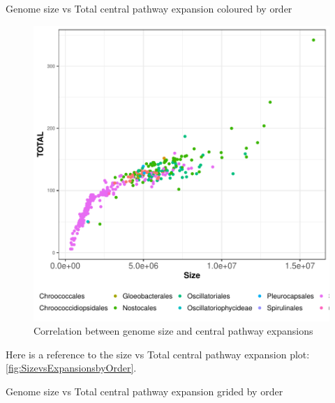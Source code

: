 \documentclass[12pt,twoside]{reedthesis}
\begin{document}
  Genome size vs Total central pathway expansion coloured by order
  
  \begin{figure}[h!tbp]
  \centering
  \includegraphics[angle = 0,scale = 1]{chapter5/SizevsExpansionsbyOrder.pdf}
  \caption[Correlation between genome size and central pathway expansions ]{\normalsize{Correlation between genome size and central pathway expansions }}
  \label{fig:SizevsExpansionsbyOrder}
  \end{figure}
  
  Here is a reference to the size vs Total central pathway expansion plot:
  \autoref{fig:SizevsExpansionsbyOrder}. \clearpage 
  
  Genome size vs Total central pathway expansion grided by order
  
\end{document}
